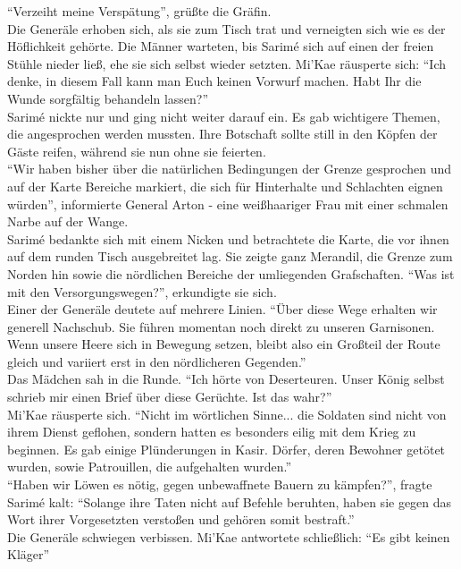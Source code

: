 ``Verzeiht meine Verspätung'', grüßte die Gräfin.\\
Die Generäle erhoben sich, als sie zum Tisch trat und verneigten sich wie es der Höflichkeit 
gehörte. Die Männer warteten, bis Sarimé sich auf einen der freien Stühle nieder ließ, ehe sie sich 
selbst wieder setzten. Mi'Kae räusperte sich: ``Ich denke, in diesem Fall kann man Euch keinen 
Vorwurf machen. Habt Ihr die Wunde sorgfältig behandeln lassen?''\\
Sarimé nickte nur und ging nicht weiter darauf ein. Es gab wichtigere Themen, die angesprochen 
werden mussten. Ihre Botschaft sollte still in den Köpfen der Gäste reifen, während sie nun ohne 
sie feierten.\\
``Wir haben bisher über die natürlichen Bedingungen der Grenze gesprochen und auf der Karte 
Bereiche markiert, die sich für Hinterhalte und Schlachten eignen würden'', informierte General 
Arton - eine weißhaariger Frau mit einer schmalen Narbe auf der Wange.\\
Sarimé bedankte sich mit einem Nicken und betrachtete die Karte, die vor ihnen auf dem runden Tisch 
ausgebreitet lag. Sie zeigte ganz Merandil, die Grenze zum Norden hin sowie die nördlichen Bereiche 
der umliegenden Grafschaften. ``Was ist mit den Versorgungswegen?'', erkundigte sie sich.\\
Einer der Generäle deutete auf mehrere Linien. ``Über diese Wege erhalten wir generell Nachschub. 
Sie führen momentan noch direkt zu unseren Garnisonen. Wenn unsere Heere sich in Bewegung setzen, 
bleibt also ein Großteil der Route gleich und variiert erst in den nördlicheren Gegenden.''\\
Das Mädchen sah in die Runde. ``Ich hörte von Deserteuren. Unser König selbst schrieb mir einen Brief über diese Gerüchte. Ist das wahr?''\\
Mi'Kae räusperte sich. ``Nicht im wörtlichen Sinne... die Soldaten sind nicht von ihrem Dienst 
geflohen, sondern hatten es besonders eilig mit dem Krieg zu beginnen. Es gab einige Plünderungen 
in Kasir. Dörfer, deren Bewohner getötet wurden, sowie Patrouillen, die aufgehalten wurden.''\\
``Haben wir Löwen es nötig, gegen unbewaffnete Bauern zu kämpfen?'', fragte Sarimé kalt: ``Solange 
ihre Taten nicht auf Befehle beruhten, haben sie gegen das Wort ihrer Vorgesetzten verstoßen und 
gehören somit bestraft.''\\
Die Generäle schwiegen verbissen. Mi'Kae antwortete schließlich: ``Es gibt keinen Kläger''\\
